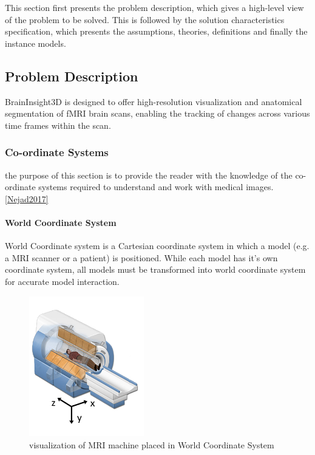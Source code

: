 \documentclass[12pt]{article}
\begin{document}
This section first presents the problem description, which gives a high-level
view of the problem to be solved.  This is followed by the solution characteristics
specification, which presents the assumptions, theories, definitions and finally
the instance models.

\subsection{Problem Description} \label{Sec_pd}

BrainInsight3D is designed to offer high-resolution visualization and anatomical
segmentation of fMRI brain scans, enabling the tracking of changes across various
time frames within the scan.

\subsubsection{Co-ordinate Systems}
the purpose of this section is to provide the reader with the knowledge of the co-ordinate systems
required to understand and work with medical images. \ref*{Nejad2017}

\paragraph*{World Coordinate System}

World Coordinate system is a Cartesian coordinate system in which a model (e.g. a MRI scanner or a patient) is positioned.
While each model has it's own coordinate system, all models must be transformed into world coordinate system for accurate model interaction.
\begin{figure}[hbpt!]
  \centering
  \includegraphics[width=50mm]{world-coordinate-sytem.png}
  \caption{visualization of MRI machine placed in World Coordinate System~\cite{SlicerWikiCoordinateSystems}}
  \label{worldcoordfMRI}
\end{figure}
\end{document}
